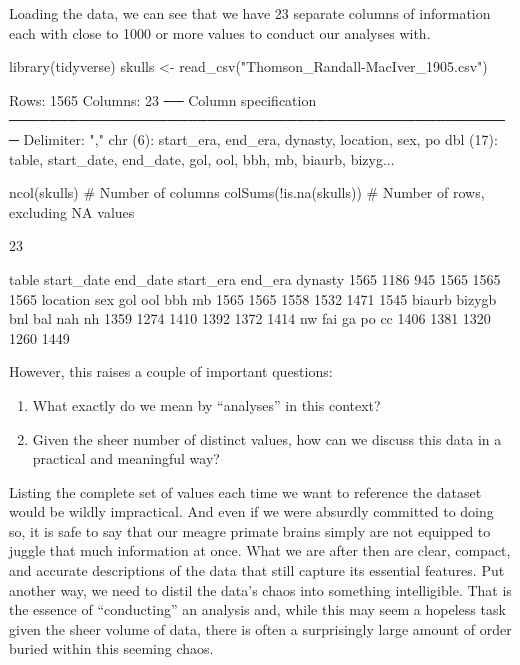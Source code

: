 

Loading the data, we can see that we have 23 separate columns of information each with close to 1000 or more values to conduct our analyses with.

\begin{inR}
library(tidyverse)
skulls <- read_csv("Thomson_Randall-MacIver_1905.csv")
\end{inR}

\begin{outR}
Rows: 1565 Columns: 23                                                   
── Column specification ───────────────────────────────────────────────────
Delimiter: ","
chr  (6): start_era, end_era, dynasty, location, sex, po
dbl (17): table, start_date, end_date, gol, ool, bbh, mb, biaurb, bizyg...
\end{outR}

\begin{inR}
ncol(skulls) # Number of columns
colSums(!is.na(skulls)) # Number of rows, excluding NA values
\end{inR}

\begin{outR}
[1] 23

   table start_date   end_date  start_era    end_era    dynasty 
    1565       1186        945       1565       1565       1565 
location        sex        gol        ool        bbh         mb 
    1565       1565       1558       1532       1471       1545 
  biaurb     bizygb        bnl        bal        nah         nh 
    1359       1274       1410       1392       1372       1414 
      nw        fai         ga         po         cc 
    1406       1381       1320       1260       1449 
\end{outR}

\noindent
However, this raises a couple of important questions:

\begin{enumerate}
    \item What exactly do we mean by ``analyses'' in this context?
    \item Given the sheer number of distinct values, how can we discuss this data in a practical and meaningful way?
\end{enumerate}

Listing the complete set of values each time we want to reference the dataset would be wildly impractical. And even if we were absurdly committed to doing so, it is safe to say that our meagre primate brains simply are not equipped to juggle that much information at once. What we are after then are clear, compact, and accurate descriptions of the data that still capture its essential features. Put another way, we need to distil the data's chaos into something intelligible. That is the essence of ``conducting'' an analysis and, while this may seem a hopeless task given the sheer volume of data, there is often a surprisingly large amount of order buried within this seeming chaos.


